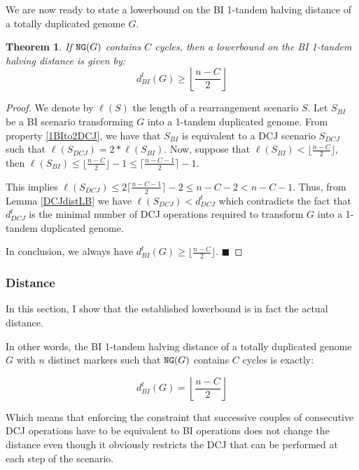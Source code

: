 \documentclass[11pt,final,twoside,nofrench]{thlifl}
\newcommand{\qed}{\ensuremath{\blacksquare}}
\renewcommand{\NG}{\ensuremath{\mbox{\texttt{NG}}}}
\newtheorem{proof}{Proof}
\newtheorem{theorem}{Theorem}
\begin{document}
We are now ready to state a lowerbound on the BI 1-tandem halving distance of a totally duplicated genome $G$.

\begin{theorem}
    If $\NG(G)$ contains $C$ cycles, then a lowerbound on the BI 1-tandem halving distance
    is given by: 
$$d^t_{BI}(G) \geq \left \lfloor \frac{n - C}{2} \right \rfloor$$
\end{theorem}

\begin{proof}


We denote by $\ell(S)$ the length of a rearrangement scenario $S$.
   Let $S_{BI}$ be a BI scenario transforming $G$ into a
   1-tandem duplicated genome.
    From property \ref{1BIto2DCJ}, we have that $S_{BI}$ is equivalent to
    a DCJ scenario $S_{DCJ}$ such that  $\ell(S_{DCJ})=2*\ell(S_{BI})$. 
    Now, suppose that $\ell(S_{BI}) < \lfloor \frac{n - C}{2}
    \rfloor$, then $\ell(S_{BI}) \leq \lfloor \frac{n - C}{2}
    \rfloor - 1 \leq \lceil \frac{n - C - 1}{2} \rceil - 1$.
    
    This implies $\ell(S_{DCJ}) \leq 2\lceil \frac{n - C - 1}{2}
    \rceil - 2 \leq n - C - 2 < n - C - 1$. Thus, from Lemma 
   \ref{DCJdistLB} we have $\ell(S_{DCJ}) < d^t_{DCJ}$ 
    which contradicts the fact that $d^t_{DCJ}$ is the minimal number
    of DCJ
    operations required to transform $G$ into a 1-tandem duplicated genome.

    In conclusion, we always have $d^t_{BI}(G) \geq \lfloor \frac{n - C}{2} \rfloor$.  \qed
\end{proof}

\subsubsection{Distance}
\label{sec:dist}

\noindent
In this section, I show that the established lowerbound is in fact the actual distance.

In other words, the BI 1-tandem halving distance of a totally duplicated genome $G$ with $n$ distinct markers such that  $\NG(G)$ contains $C$ cycles is exactly:

$$d^t_{BI}(G) = \left \lfloor \frac{n - C}{2} \right \rfloor$$

Which means that enforcing the constraint that successive couples 
of consecutive DCJ operations have to be equivalent to BI operations does not 
change the distance even though it 
obviously restricts the DCJ that can be performed at each step of the scenario. 
\end{document}
